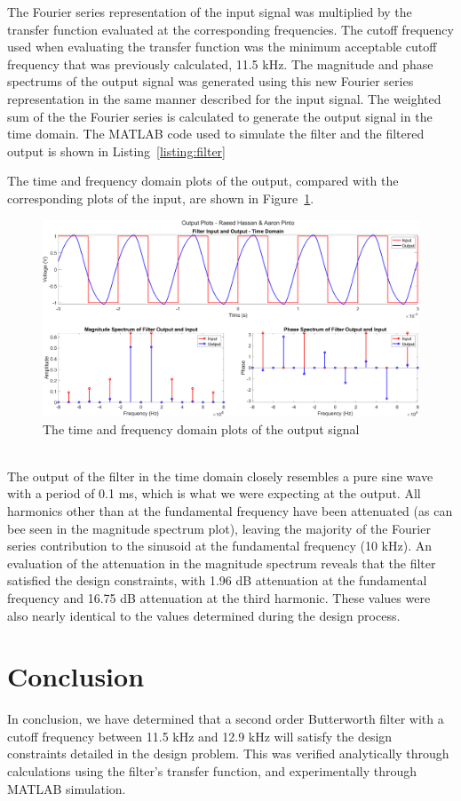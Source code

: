 \documentclass[12pt]{article}
\begin{document}
The Fourier series representation of the input signal was multiplied by the transfer function evaluated at the corresponding frequencies. The cutoff frequency used when evaluating the transfer function was the minimum acceptable cutoff frequency that was previously calculated, 11.5 kHz. The magnitude and phase spectrums of the output signal was generated using this new Fourier series representation in the same manner described for the input signal. The weighted sum of the the Fourier series is calculated to generate the output signal in the time domain. The MATLAB code used to simulate the filter and the filtered output is shown in Listing~\ref{listing:filter}


The time and frequency domain plots of the output, compared with the corresponding plots of the input, are shown in Figure~\ref{fig:output}. 
\begin{figure}[h!]
    \includegraphics[width=\textwidth]{output.png}
    \caption{\label{fig:output} The time and frequency domain plots of the output signal}
\end{figure} \\
The output of the filter in the time domain closely resembles a pure sine wave with a period of 0.1 ms, which is what we were expecting at the output. All harmonics other than at the fundamental frequency have been attenuated (as can bee seen in the magnitude spectrum plot), leaving the majority of the Fourier series contribution to the sinusoid at the fundamental frequency (10 kHz). An evaluation of the attenuation in the magnitude spectrum reveals that the filter satisfied the design constraints, with 1.96 dB attenuation at the fundamental frequency and 16.75 dB attenuation at the third harmonic. These values were also nearly identical to the values determined during the design process.

\clearpage
\section*{Conclusion}
In conclusion, we have determined that a second order Butterworth filter with a cutoff frequency between 11.5 kHz and 12.9 kHz will satisfy the design constraints detailed in the design problem. This was verified analytically through calculations using the filter's transfer function, and experimentally through MATLAB simulation.
\end{document}
